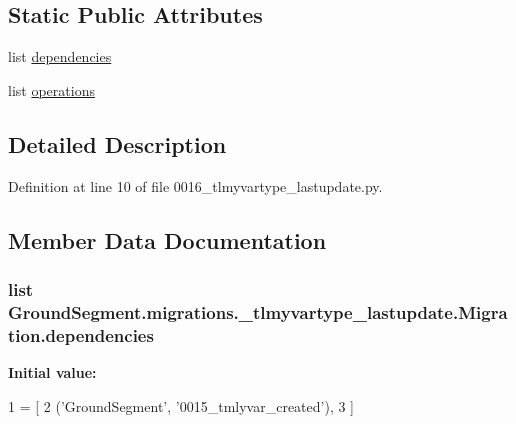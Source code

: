 \subsection*{Static Public Attributes}
\begin{DoxyCompactItemize}
\item 
list \hyperlink{class_ground_segment_1_1migrations_1_10016__tlmyvartype__lastupdate_1_1_migration_a8ae5be29df23f59ed8f79db439179b7e}{dependencies}
\item 
list \hyperlink{class_ground_segment_1_1migrations_1_10016__tlmyvartype__lastupdate_1_1_migration_ab1e4253736a4fd85a59e138c7ae6e843}{operations}
\end{DoxyCompactItemize}


\subsection{Detailed Description}


Definition at line 10 of file 0016\+\_\+tlmyvartype\+\_\+lastupdate.\+py.



\subsection{Member Data Documentation}
\hypertarget{class_ground_segment_1_1migrations_1_10016__tlmyvartype__lastupdate_1_1_migration_a8ae5be29df23f59ed8f79db439179b7e}{}
\subsubsection[{dependencies}]{\setlength{\rightskip}{0pt plus 5cm}list Ground\+Segment.\+migrations.\+\_\+tlmyvartype\+\_\+lastupdate.\+Migration.\+dependencies\hspace{0.3cm}{\ttfamily [static]}}\label{class_ground_segment_1_1migrations_1_10016__tlmyvartype__lastupdate_1_1_migration_a8ae5be29df23f59ed8f79db439179b7e}
{\bfseries Initial value\+:}
\begin{DoxyCode}
1 = [
2         (\textcolor{stringliteral}{'GroundSegment'}, \textcolor{stringliteral}{'0015\_tmlyvar\_created'}),
3     ]
\end{DoxyCode}


